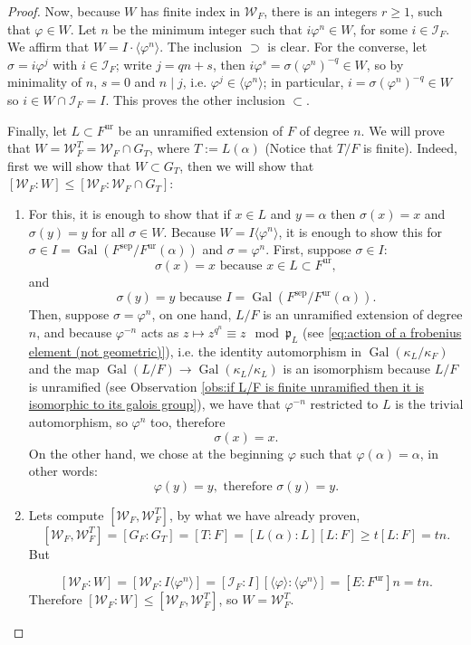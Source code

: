 \documentclass[12pt]{article}
\theoremstyle{plain}
\theoremstyle{definition}
\newcommand{\Gal}[2]{\operatorname{Gal} ( #1 / #2 )}
\newcommand{\primo}[1]{\mathfrak{#1}}
\newcommand{\sep}[1]{{#1}^{\operatorname{sep}}}
\newcommand{\ur}[1]{{#1}^{\operatorname{ur}}}
\newcommand{\inercia}[1]{\mathcal I_{#1}}
\newcommand{\weil}[1]{\mathcal W_{#1}}
\begin{document}
\begin{proof}
Now, because $W$ has finite index in $\weil F$, there is an integers $r \geq 1$, such that $\varphi \in W$. Let $n$ be the minimum integer such that $i \varphi^n \in W$, for some $i \in \inercia F$. We affirm that $W = I \cdot \langle \varphi^n \rangle$. The inclusion $\supset$ is clear. For the converse, let $\sigma = i \varphi^j$ with $i \in \inercia F$; write $j = q n + s$, then $i \varphi^s = \sigma (\varphi^{n})^{-q} \in W$, so by minimality of $n$, $s = 0$ and $n \mid j$, i.e. $\varphi^j \in \langle \varphi^n \rangle$; in particular, $i = \sigma (\varphi^n)^{-q} \in W$ so $i \in W \cap \inercia F = I$. This proves the other inclusion $\subset$.

Finally, let $L \subset \ur F$ be an unramified extension of $F$ of degree $n$. We will prove that $W = \weil F^T = \weil F \cap G_T$, where $T := L (\alpha)$ (Notice that $T/F$ is finite). Indeed, first we will show that $W \subset G_T$, then we will show that $[\weil F : W] \leq [\weil F : \weil F \cap G_T]$:
\begin{enumerate}
\item For this, it is enough to show that if $x \in L$ and $y = \alpha$ then $\sigma ( x) = x$ and $\sigma (y ) = y$ for all $\sigma \in W$. Because $W = I \langle \varphi^n \rangle$, it is enough to show this for $\sigma \in I = \Gal {\sep F} {\ur F (\alpha)}$ and $\sigma = \varphi^n$. First, suppose $\sigma \in I$:
\[
    \sigma (x) = x \text{ because $x \in L \subset \ur F$},
\]
and
\[
    \sigma (y) = y \text{ because $I = \Gal {\sep F} {\ur F (\alpha)}$}.
\]
Then, suppose $\sigma = \varphi^n$, on one hand, $L/F$ is an unramified extension of degree $n$, and because $\varphi^{-n}$ acts as $z \mapsto z^{q^n} \equiv z \mod \primo p_L$ (see \eqref{eq:action of a frobenius element (not geometric)}), i.e. the identity automorphism in $\Gal {\kappa_L} {\kappa_F}$ and the map $\Gal {L} F \to \Gal {\kappa_L} {\kappa_L}$ is an isomorphism because $L/F$ is unramified (see Observation \ref{obs:if L/F is finite unramified then it is isomorphic to its galois group}), we have that $\varphi^{-n}$ restricted to $L$ is the trivial automorphism, so $\varphi^n$ too, therefore
\[
    \sigma (x) = x.
\]
On the other hand, we chose at the beginning $\varphi$ such that $\varphi (\alpha) = \alpha$, in other words:
\[
    \varphi (y) = y, \text{ therefore } \sigma (y) = y.
\]
\item Lets compute $[\weil F, \weil F^T]$, by what we have already proven,
\[
    [\weil F , \weil F^T] = [G_F : G_T] =  [T : F] = [L(\alpha) : L][L : F]\geq t [L : F] = t n.
\]
But

\[
    [\weil F : W] = [\weil F : I \langle \varphi ^n \rangle] = [\inercia F : I][\langle \varphi \rangle : \langle \varphi ^n \rangle] = [E : \ur F] n = t n.
\]
Therefore $[\weil F : W] \leq [\weil F, \weil F^T]$, so $W = \weil F^T$.
\end{enumerate}
\end{proof}
\end{document}
